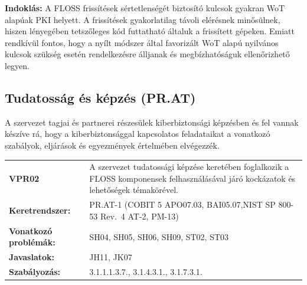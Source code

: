 \documentclass[12pt,magyar,a4paper,oneside]{scrreprt}
\begin{document}
\textbf{Indoklás: } A FLOSS frissítések sértetlenségét biztosító kulcsok
gyakran WoT alapúak PKI helyett. A frissítések gyakorlatilag távoli
elérésnek minősülnek, hiszen lényegében tetszőleges kód futtatható
általuk a frissített gépeken. Emiatt rendkívül fontos, hogy a nyílt
módszer által favorizált WoT alapú nyilvános kulcsok szükség esetén
rendelkezésre álljanak és megbízhatóságuk ellenőrizhető legyen.

\hypertarget{tudatossuxe1g-uxe9s-kuxe9pzuxe9s-pr.at}{%
\subsection{Tudatosság és képzés
(PR.AT)}\label{tudatossuxe1g-uxe9s-kuxe9pzuxe9s-pr.at}}

A szervezet tagjai és partnerei részesülek kiberbiztonsági képzésben és
fel vannak készíve rá, hogy a kiberbiztonsággal kapcsolatos feladataikat
a vonatkozó szabályok, eljárások és egyezmények értelmében elvégezzék.

\begin{longtable}[]{@{}ll@{}}
\toprule
\endhead
\begin{minipage}[t]{0.16\columnwidth}\raggedright
\textbf{VPR02}\strut
\end{minipage} & \begin{minipage}[t]{0.79\columnwidth}\raggedright
A szervezet tudatossági képzése keretében foglalkozik a FLOSS
komponensek felhasználásával járó kockázatok és lehetőségek
témakörével.\strut
\end{minipage}\tabularnewline
\begin{minipage}[t]{0.16\columnwidth}\raggedright
\textbf{Keretrendszer:}\strut
\end{minipage} & \begin{minipage}[t]{0.79\columnwidth}\raggedright
PR.AT-1 (COBIT 5 APO07.03, BAI05.07,NIST SP 800-53 Rev.~4 AT-2,
PM-13)\strut
\end{minipage}\tabularnewline
\begin{minipage}[t]{0.16\columnwidth}\raggedright
\textbf{Vonatkozó problémák:}\strut
\end{minipage} & \begin{minipage}[t]{0.79\columnwidth}\raggedright
SH04, SH05, SH06, SH09, ST02, ST03\strut
\end{minipage}\tabularnewline
\begin{minipage}[t]{0.16\columnwidth}\raggedright
\textbf{Javaslatok:}\strut
\end{minipage} & \begin{minipage}[t]{0.79\columnwidth}\raggedright
JH11, JK07\strut
\end{minipage}\tabularnewline
\begin{minipage}[t]{0.16\columnwidth}\raggedright
\textbf{Szabályozás:}\strut
\end{minipage} & \begin{minipage}[t]{0.79\columnwidth}\raggedright
3.1.1.1.3.7., 3.1.4.3.1., 3.1.7.3.1.\strut
\end{minipage}\tabularnewline
\bottomrule
\end{longtable}
\end{document}
